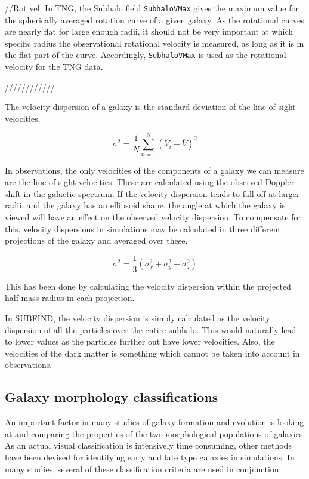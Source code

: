 //Rot vel: In TNG, the Subhalo field \texttt{SubhaloVMax} gives the maximum value for the spherically averaged rotation curve of a given galaxy. As the rotational curves are nearly flat for large enough radii, it should not be very important at which specific radius the observational rotational velocity is measured, as long as it is in the flat part of the curve. Accordingly, \texttt{SubhaloVMax} is used as the rotational velocity for the TNG data.

////////////

The velocity dispersion of a galaxy is the standard deviation of the line-of sight velocities.

\begin{equation} \label{standard_dev}
    \sigma^{2} = \frac{1}{N} \sum_{n=1}^{N} (V_{i} - \overline{V})^2
\end{equation}

In observations, the only velocities of the components of a galaxy we can measure are the line-of-sight velocities. These are calculated using the observed Doppler shift in the galactic spectrum. If the velocity dispersion tends to fall off at larger radii, and the galaxy has an ellipsoid shape, the angle at which the galaxy is viewed will have an effect on the observed velocity dispersion. To compensate for this, velocity dispersions in simulations may be calculated in three different projections of the galaxy and averaged over these. 

\begin{equation} \label{sigma1}
    \sigma^{2} = \frac{1}{3}(\sigma_x^2 + \sigma_y^2 + \sigma_z^2)
\end{equation}

This has been done by calculating the velocity dispersion within the projected half-mass radius in each projection.


In SUBFIND, the velocity dispersion is simply calculated as the velocity dispersion of all the particles over the entire subhalo. This would naturally lead to lower values as the particles further out have lower velocities. Also, the velocities of the dark matter is something which cannot be taken into account in observations.


\subsection{Galaxy morphology classifications}

An important factor in many studies of galaxy formation and evolution is looking at and comparing the properties of the two morphological populations of galaxies. As an actual visual classification is intensively time consuming, other methods have been devised for identifying early and late type galaxies in simulations. In many studies, several of these classification criteria are used in conjunction.

